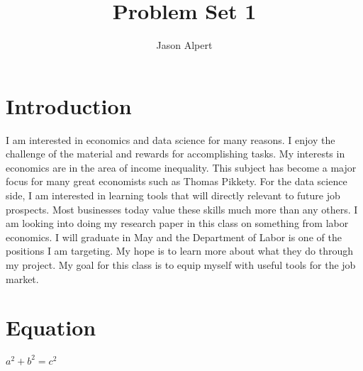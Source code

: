 \documentclass{article}
\title{Problem Set 1}
\author{Jason Alpert}
\begin{document}
\section{Introduction}

I am interested in economics and data science for many reasons.  I enjoy the challenge of the material and rewards for accomplishing tasks.  My interests in economics are in the area of income inequality.  This subject has become a major focus for many great economists such as Thomas Pikkety. For the data science side, I am interested in learning tools that will directly relevant to future job prospects.  Most businesses today value these skills much more than any others.  I am looking into doing my research paper in this class on something from labor economics.  I will graduate in May and the Department of Labor is one of the positions I am targeting.  My hope is to learn more about what they do through my project. My goal for this class is to equip myself with useful tools for the job market.

\section{Equation}

\vspace{2mm}

$a^2 +b^2 = c^2$
\end{document}
